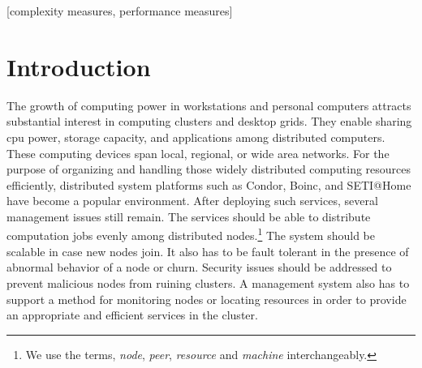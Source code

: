 \documentclass{acm_proc_article-sp}
\begin{document}
[complexity measures, performance measures]



\section{Introduction}
The growth of computing power in workstations and personal computers attracts substantial interest in computing clusters and desktop grids\cite{bonic}\cite{condor}\cite{setiathome}. 
They enable sharing cpu power, storage capacity, and applications among distributed computers. 
These computing devices span local, regional, or wide area networks.
For the purpose of organizing and handling those widely distributed computing resources efficiently, distributed system platforms such as Condor\cite{condor}, Boinc\cite{bonic}, and SETI@Home\cite{setiathome} have become a popular environment.
After deploying such services, several management issues still remain. The services should be able to distribute computation jobs evenly among distributed nodes.\footnote{We use the terms, \textit{node}, \textit{peer}, \textit{resource} and \textit{machine} interchangeably.}
The system should be scalable in case new nodes join. It also has to be fault tolerant in the presence of abnormal behavior of a node or churn. 
Security issues should be addressed to prevent malicious nodes from ruining clusters.
A management system also has to support a method for monitoring nodes or locating resources in order to provide an appropriate and efficient services in the cluster.
\end{document}
